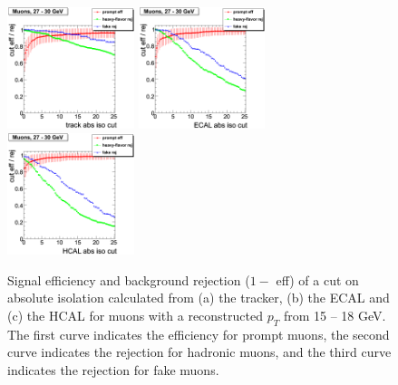 \begin{figure}[htbp]
   \includegraphics[width = 0.33\textwidth]{pictures/absIsoCut_absIsoCutEff/absIsoCut_trackIso_cutEff_muon_ptCut8_ptCut9.png}
   \includegraphics[width = 0.33\textwidth]{pictures/absIsoCut_absIsoCutEff/absIsoCut_ecalIso_cutEff_muon_ptCut8_ptCut9.png}
   \includegraphics[width = 0.33\textwidth]{pictures/absIsoCut_absIsoCutEff/absIsoCut_hcalIso_cutEff_muon_ptCut8_ptCut9.png}
   \caption{Signal efficiency and background rejection ($1 - $ eff) of a cut on absolute isolation
      calculated from (a) the tracker, (b) the ECAL and (c) the HCAL for muons with a reconstructed
      $p_{T}$ from 15 -- 18 GeV. The first curve indicates the efficiency for prompt muons, the
      second curve indicates the rejection for hadronic muons, and the third curve indicates the
      rejection for fake muons.}
   \label{fig:AbsIsoCut_CutEffRej_Muon_PtCut4_PtCut5}
\end{figure}

\clearpage

